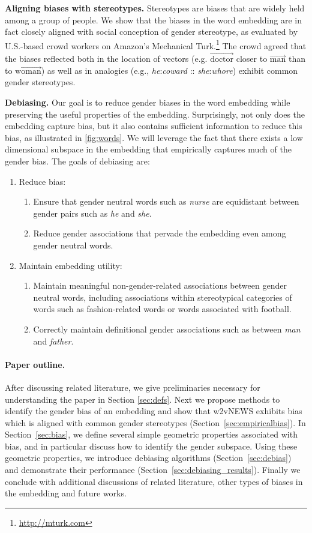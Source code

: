 \documentclass{article}
\newcommand{\wvec}[1]{\overrightarrow{\text{#1}}}
\begin{document}
 

\smallskip
\noindent
{\bf Aligning biases with stereotypes.} Stereotypes are biases that are widely held among a group of people. We show that the biases in the word embedding are in fact closely aligned with social conception of gender stereotype, as evaluated by U.S.-based crowd workers on Amazon's Mechanical Turk.\footnote{\url{http://mturk.com}} The crowd agreed that the biases reflected both in the location of vectors (e.g. $\wvec{doctor}$ closer to $\wvec{man}$ than to $\wvec{woman}$) as well as in analogies (e.g., \emph{he}:\emph{coward} :: \emph{she}:\emph{whore}) exhibit common gender stereotypes. 


\smallskip
\noindent
{\bf Debiasing.} 
Our goal is to reduce gender biases in the word embedding while preserving the useful properties of the embedding. 
Surprisingly, not only does the embedding capture bias, but it also contains sufficient information to reduce this bias, as illustrated in \ref{fig:words}. We will leverage the fact that there exists a low dimensional subspace in the embedding that empirically captures much of the gender bias. 
The goals of debiasing are:
\begin{enumerate}
\item Reduce bias:
\begin{enumerate}
\item Ensure that gender neutral words such as {\em nurse} are equidistant between gender pairs such as {\em he} and {\em she}.
\item Reduce gender associations that pervade the embedding even among gender neutral words. 
\end{enumerate}
\item Maintain embedding utility:
\begin{enumerate}
\item Maintain meaningful non-gender-related associations between gender neutral words, including associations within stereotypical categories of words such as fashion-related words or words associated with football.
\item Correctly maintain definitional gender associations such as between {\em man} and {\em father}.
\end{enumerate}
\end{enumerate}

\paragraph{Paper outline.} 
After discussing related literature, we give preliminaries necessary for understanding the paper in Section \ref{sec:defs}. Next we propose methods to identify the gender bias of an embedding and show that w2vNEWS exhibits bias which is aligned with common gender stereotypes (Section~\ref{sec:empiricalbias}). In Section~\ref{sec:bias}, we define several simple geometric properties associated with bias, and in particular discuss how to identify the gender subspace. Using these geometric properties, we introduce debiasing algorithms (Section~\ref{sec:debias}) and demonstrate their performance (Section~\ref{sec:debiasing_results}). Finally we conclude with additional discussions of related literature, other types of biases in the embedding and future works. 
\end{document}
